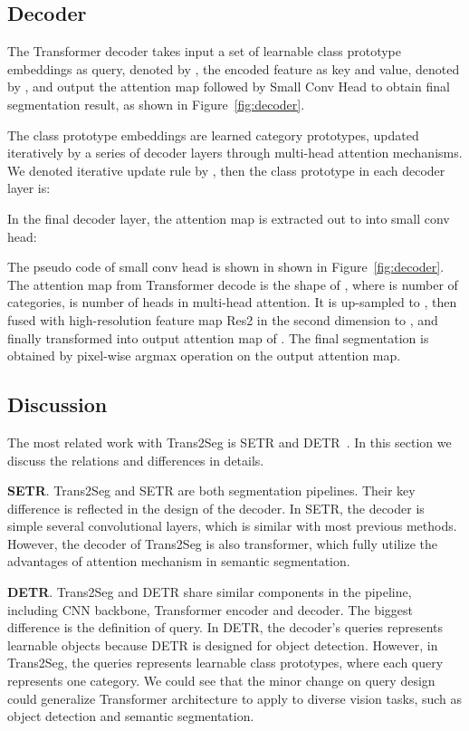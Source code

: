 \documentclass{article}
\begin{document}
\subsection{Decoder}
The Transformer decoder takes input a set of learnable class prototype embeddings as query, denoted by , the encoded feature as key and value, denoted by , and output the attention map followed by Small Conv Head to obtain final segmentation result, as shown in Figure~\ref{fig:decoder}.

The class prototype embeddings are learned category prototypes, updated iteratively by a series of decoder layers through multi-head attention mechanisms. We denoted iterative update rule by , then the class prototype in each decoder layer is:


In the final decoder layer, the attention map is extracted out to into small conv head: 


The pseudo code of small conv head is shown in shown in Figure~\ref{fig:decoder}. The attention map from Transformer decode is the shape of , where  is number of categories,  is number of heads in multi-head attention. It is up-sampled to , then fused with high-resolution feature map Res2 in the second dimension to , and finally transformed into output attention map of . The final segmentation is obtained by pixel-wise argmax operation on the output attention map.

\subsection{Discussion}
The most related work with Trans2Seg is SETR and DETR~\cite{zheng2020setr,DETR}. In this section we discuss the relations and differences in details.

\textbf{SETR}. Trans2Seg and SETR are both segmentation pipelines. Their key difference is reflected in the design of the decoder. In SETR, the decoder is simple several convolutional layers, which is similar with most previous methods. However, the decoder of Trans2Seg is also transformer, which fully utilize the advantages of attention mechanism in semantic segmentation.

\textbf{DETR}. Trans2Seg and DETR share similar components in the pipeline, including CNN backbone, Transformer encoder and decoder. The biggest difference is the definition of query. 
In DETR, the decoder's queries represents  learnable objects because DETR is designed for object detection.
However, in Trans2Seg, the queries represents  learnable class prototypes, where each query represents one category. 
We could see that the minor change on query design could generalize Transformer architecture to apply to diverse vision tasks, such as object detection and semantic segmentation.
\end{document}
